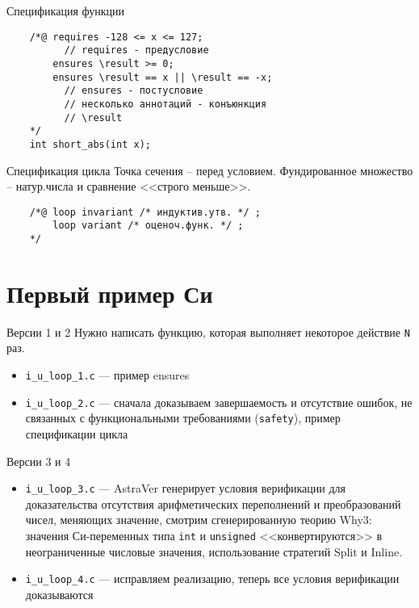 \documentclass[hyperref={unicode=true}]{beamer}
\begin{document}
    \begin{frame}[fragile]{Спецификация функции}
    \begin{verbatim}
    /*@ requires -128 <= x <= 127;
          // requires - предусловие
        ensures \result >= 0;
        ensures \result == x || \result == -x;
          // ensures - постусловие
          // несколько аннотаций - конъюнкция
          // \result
    */
    int short_abs(int x);
    \end{verbatim}
    \end{frame}

    \begin{frame}[fragile]{Спецификация цикла}
    Точка сечения -- перед условием. Фундированное множество -- натур.числа и сравнение <<строго меньше>>.

    \begin{verbatim}
    /*@ loop invariant /* индуктив.утв. */ ;
        loop variant /* оценоч.функ. */ ;
    */
    \end{verbatim}
    \end{frame}

    \section{Первый пример Си}

    \begin{frame}{Версии 1 и 2}
    Нужно написать функцию, которая выполняет некоторое действие \texttt{N} раз.
    \begin{itemize}
    \item \texttt{i\_u\_loop\_1.c} --- пример ensures
    \item \texttt{i\_u\_loop\_2.c} --- сначала доказываем завершаемость и отсутствие ошибок, не связанных с функциональными требованиями (\texttt{safety}), пример спецификации цикла
    \end{itemize}
    \end{frame}

    \begin{frame}{Версии 3 и 4}
    \begin{itemize}
    \item \texttt{i\_u\_loop\_3.c} --- AstraVer генерирует условия верификации для доказательства отсутствия арифметических переполнений и преобразований чисел, меняющих значение, смотрим сгенерированную теорию Why3: значения Си-переменных типа \texttt{int} и \texttt{unsigned} <<конвертируются>> в неограниченные числовые значения, использование стратегий Split и Inline.
    \item \texttt{i\_u\_loop\_4.c} --- исправляем реализацию, теперь все условия верификации доказываются
    \end{itemize}
    \end{frame}
\end{document}
